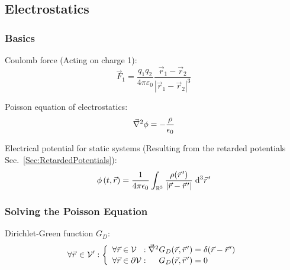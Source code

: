 	\subsection{Electrostatics}
		\subsubsection{Basics}
			\noindent
			Coulomb force (Acting on charge 1):
			\begin{equation}
				\vec{F}_1 = \frac{q_1 q_2}{4\pi\varepsilon_0}\frac{\vec{r}_1-\vec{r}_2}{\left|\vec{r}_1-\vec{r}_2\right|^3}
			\end{equation}

			\noindent
			Poisson equation of electrostatics:
			\begin{equation}
				\vec{\nabla}^2\phi = -\frac{\rho}{\epsilon_0}
				\label{Eq:Poisson}
			\end{equation}

			\noindent
			Electrical potential for static systems (Resulting from the retarded potentials Sec.~\ref{Sec:RetardedPotentials}):
			\begin{equation}
				\phi\left(t,\vec{r}\right)
				= \frac{1}{4\pi\epsilon_0} \int_{\mathbb{R}^3} \frac{\rho(\pvec{r}')}{\left|\vec{r}-\pvec{r}'\right|}\;\diff^3 \pvec{r}'
			\end{equation}

		\subsubsection{Solving the Poisson Equation}
			\noindent
			Dirichlet-Green function $G_D$:
			\begin{equation}
				\forall\pvec{r}\in\mathcal{V}': \left\{\begin{array}{ll}
						\forall\vec{r}\in\mathcal{V}\phantom\partial:
						\Nabla^2 G_D(\vec{r},\pvec{r}') = \delta(\vec{r}-\pvec{r}') \\
						\forall\vec{r}\in\partial\mathcal{V}:
						\phantom{\Nabla^2}G_D(\vec{r},\pvec{r}') = 0
					\end{array}\right.
			\end{equation}

